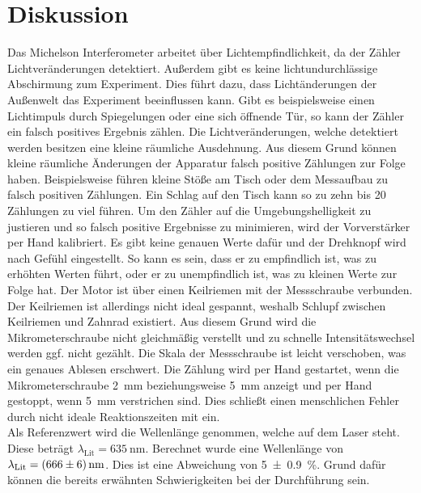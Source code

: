 %

%
\section{Diskussion}
\label{sec:Diskussion}

Das Michelson Interferometer arbeitet über Lichtempfindlichkeit, da der Zähler Lichtveränderungen detektiert. 
Außerdem gibt es keine lichtundurchlässige Abschirmung zum Experiment. Dies führt dazu, dass Lichtänderungen 
der Außenwelt das Experiment beeinflussen kann. Gibt es beispielsweise einen Lichtimpuls durch Spiegelungen 
oder eine sich öffnende Tür, so kann der Zähler ein falsch positives Ergebnis zählen. 
Die Lichtveränderungen, welche detektiert werden besitzen eine kleine räumliche Ausdehnung. Aus diesem Grund 
können kleine räumliche Änderungen der Apparatur falsch positive Zählungen zur Folge haben. Beispielsweise 
führen kleine Stöße am Tisch oder dem Messaufbau zu falsch positiven Zählungen. Ein Schlag auf den Tisch kann 
so zu zehn bis 20 Zählungen zu viel führen. Um den Zähler auf die Umgebungshelligkeit zu justieren und so 
falsch positive Ergebnisse zu minimieren, wird der Vorverstärker per Hand kalibriert. Es gibt keine genauen 
Werte dafür und der Drehknopf wird nach Gefühl eingestellt. So kann es sein, dass er zu empfindlich ist, 
was zu erhöhten Werten führt, oder er zu unempfindlich ist, was zu kleinen Werte zur Folge hat. 
Der Motor ist über einen Keilriemen mit der Messschraube verbunden. Der Keilriemen ist allerdings nicht ideal 
gespannt, weshalb Schlupf zwischen Keilriemen und Zahnrad existiert. Aus diesem Grund wird die Mikrometerschraube 
nicht gleichmäßig verstellt und zu schnelle Intensitätswechsel werden ggf. nicht gezählt. Die Skala der 
Messschraube ist leicht verschoben, was ein genaues Ablesen erschwert. Die Zählung wird per Hand gestartet, 
wenn die Mikrometerschraube \qty{2}{\milli \meter} beziehungsweise \qty{5}{\milli \meter} anzeigt und per Hand 
gestoppt, wenn \qty{5}{\milli \meter} verstrichen sind. Dies schließt einen menschlichen Fehler durch nicht 
ideale Reaktionszeiten mit ein.\\

\noindent Als Referenzwert wird die Wellenlänge genommen, welche auf dem Laser steht. Diese beträgt 
$\lambda_\text{Lit} = \qty{635}{\nano \meter}$. Berechnet wurde eine Wellenlänge von 
$\lambda_\text{Lit} = \qty{666\pm6}{\nano \meter}$. Dies ist eine Abweichung von \qty{5\pm0.9}{\percent}.
Grund dafür können die bereits erwähnten Schwierigkeiten bei der Durchführung sein.\\

